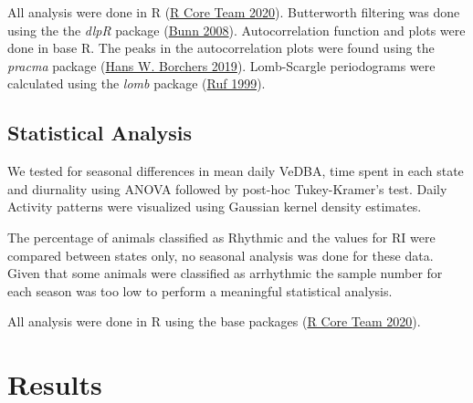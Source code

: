 \documentclass[english,msc,numbers,hidelinks]{coppe}
\begin{document}
  All analysis were done in R (\protect\hyperlink{ref-rcoreteam2020}{R Core Team 2020}). Butterworth filtering was done using the the \emph{dlpR} package (\protect\hyperlink{ref-bunn2008}{Bunn 2008}). Autocorrelation function and plots were done in base R. The peaks in the autocorrelation plots were found using the \emph{pracma} package (\protect\hyperlink{ref-hansw.borchers2019}{Hans W. Borchers 2019}). Lomb-Scargle periodograms were calculated using the \emph{lomb} package (\protect\hyperlink{ref-ruf1999}{Ruf 1999}).

  \hypertarget{statistical-analysis}{%
  \subsection{Statistical Analysis}\label{statistical-analysis}}

  We tested for seasonal differences in mean daily VeDBA, time spent in each state and diurnality using ANOVA followed by post-hoc Tukey-Kramer's test. Daily Activity patterns were visualized using Gaussian kernel density estimates.

  The percentage of animals classified as Rhythmic and the values for RI were compared between states only, no seasonal analysis was done for these data. Given that some animals were classified as arrhythmic the sample number for each season was too low to perform a meaningful statistical analysis.

  All analysis were done in R using the base packages (\protect\hyperlink{ref-rcoreteam2020}{R Core Team 2020}).

  \newpage

  \hypertarget{results}{%
  \section{Results}\label{results}}
\end{document}
